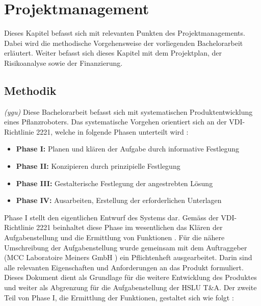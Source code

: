 \newpage
\section{Projektmanagement}
Dieses Kapitel befasst sich mit relevanten Punkten des Projektmanagements. Dabei wird die methodische Vorgehensweise der vorliegenden Bachelorarbeit erläutert. Weiter befasst sich dieses Kapitel mit dem Projektplan, der Risikoanalyse sowie der Finanzierung. 
\subsection{Methodik}
\label{methodik}
\textit{(ygu)} Diese Bachelorarbeit befasst sich mit systematischen Produktentwicklung eines Pflanzroboters. Das systematische Vorgehen orientiert sich  an der VDI-Richtlinie 2221, welche in folgende Phasen unterteilt wird \cite{naefe}:

\begin{itemize}
	\item \textbf{Phase I:} Planen und klären der Aufgabe durch informative Festlegung
	
	\item \textbf{Phase II:} Konzipieren durch prinzipielle Festlegung
	
	\item \textbf{Phase III:} Gestalterische Festlegung der angestrebten Lösung
	
	\item \textbf{Phase IV:} Ausarbeiten, Erstellung der erforderlichen Unterlagen
	
\end{itemize}

Phase I stellt den eigentlichen Entwurf des Systems dar. Gemäss der VDI-Richtlinie 2221 beinhaltet diese Phase im wesentlichen das Klären der Aufgabenstellung und die Ermittlung von Funktionen \cite{vdi2221}. Für die nähere Umschreibung der Aufgabenstellung wurde gemeinsam mit dem Auftraggeber (MCC Laboratoire Meiners GmbH ) ein Pflichtenheft ausgearbeitet. Darin sind alle relevanten Eigenschaften und Anforderungen an das Produkt formuliert. Dieses Dokument dient als Grundlage für die weitere Entwicklung des Produktes und weiter als Abgrenzung für die Aufgabenstellung der HSLU T\&A. Der zweite Teil von Phase I, die Ermittlung der Funktionen, gestaltet sich wie folgt \cite{pahl}:

